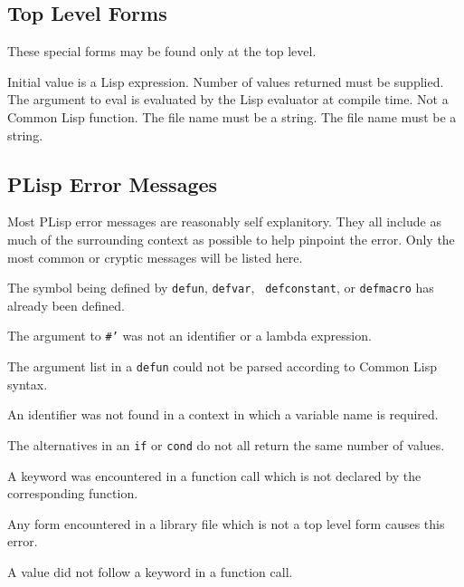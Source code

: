 \subsection{Top Level Forms}
These special forms may be found only at the top level.

\begin{list} %
{} {\setlength{\itemsep}{0in}\setlength{\labelwidth}{1.1in}
\setlength{\labelsep}{0in}
\setlength{\leftmargin}{1.1in}}
 {Initial value is a Lisp expression.}
 {Number of values returned must be supplied.}
 {}
 {}
 {The argument to eval is evaluated by the Lisp evaluator
at compile time.}
 {Not a Common Lisp function.  The file name must be
a string.}
 {The file name must be a string.}
\end{list}

\subsection{PLisp Error Messages}
Most PLisp error messages are reasonably self explanitory.  They all
include as much of the surrounding context as possible to help
pinpoint the error.  Only the most common or cryptic messages will be
listed here.

{The symbol being defined by {\tt defun}, {\tt defvar}, {\tt
defconstant}, or {\tt defmacro} has already been defined.}

{The argument to {\tt \#'} was not an identifier or a lambda expression.}

{The argument list in a {\tt defun} could not be parsed according to
Common Lisp syntax.}

{An identifier was not found in a context in which a variable name is
required.}

{The alternatives in an {\tt if} or {\tt cond} do not all return the same
number of values. }

{A keyword was encountered in a function call which is not declared by
the corresponding function.}

{Any form encountered in a library file which is not a top level form
causes this error.}

{A value did not follow a keyword in a function call.}

